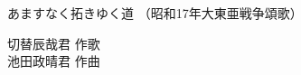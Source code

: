 \documentclass[10pt,b5j]{tarticle} %
\begin{document}
\begin{minipage}[c]{0.7\hsize} %
    \begin{center}
        {\LARGE
            あますなく拓きゆく道 %
        }
        {\small 
            （昭和17年大東亜戦争頌歌） %
        }
    \end{center}
\end{minipage}
\begin{minipage}[c]{0.3\hsize} %
    \begin{flushright} %
        切替辰哉君 作歌\\池田政晴君 作曲 %
    \end{flushright}
\end{minipage}
\end{document}

